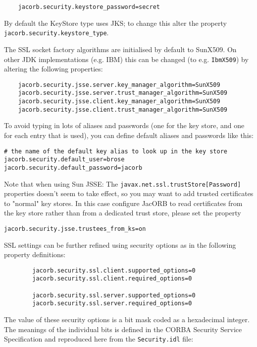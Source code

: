 \begin{verbatim}
    jacorb.security.keystore_password=secret
\end{verbatim}

By default the KeyStore type uses JKS; to change this alter the property
{\tt jacorb.security.keystore\_type}.

The SSL socket factory algorithms are initialised by default to SunX509. On
other JDK implementations (e.g. IBM) this can be changed (to e.g.
{\tt IbmX509}) by altering the following properties:

\begin{verbatim}
    jacorb.security.jsse.server.key_manager_algorithm=SunX509
    jacorb.security.jsse.server.trust_manager_algorithm=SunX509
    jacorb.security.jsse.client.key_manager_algorithm=SunX509
    jacorb.security.jsse.client.trust_manager_algorithm=SunX509
\end{verbatim}

To avoid  typing in  lots of  aliases and passwords  (one for  the key
store, and  one for each entry  that is used), you  can define default
aliases and passwords like this:

\begin{verbatim}
# the name of the default key alias to look up in the key store
jacorb.security.default_user=brose
jacorb.security.default_password=jacorb
\end{verbatim}

Note that when using Sun JSSE: The {\tt javax.net.ssl.trustStore[Password]}
properties doesn't seem to take effect, so you may want to add trusted
certificates to "normal" key stores. In this case configure JacORB to read
certificates from the key store rather than from a dedicated trust
store, please set the property
\begin{verbatim}
jacorb.security.jsse.trustees_from_ks=on
\end{verbatim}

SSL settings can be further refined using security options as in
the following property definitions:

\begin{verbatim}
        jacorb.security.ssl.client.supported_options=0
        jacorb.security.ssl.client.required_options=0

        jacorb.security.ssl.server.supported_options=0
        jacorb.security.ssl.server.required_options=0
\end{verbatim}

The  value  of  these security  options  is  a  bit  mask coded  as  a
hexadecimal integer. The meanings of the individual bits is defined in
the CORBA Security Service  Specification and reproduced here from the
{\tt Security.idl} file:


